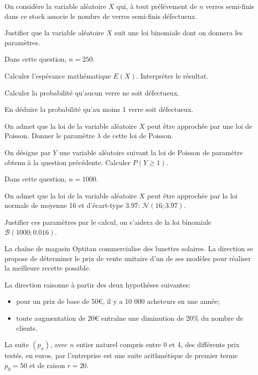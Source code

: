 \documentclass[a4paper,12pt]{scrartcl}
\begin{document}
On considère la variable aléatoire $X$ qui, à tout prélèvement de $n$ verres semi-finis dans ce stock associe le nombre de verres semi-finis défectueux.

\question{}
Justifier que la variable aléatoire $X$ suit une loi binomiale dont on donnera les paramètres. 

\question{}
Dans cette question, $n=250$.

\subquestion{}
Calculer l'espérance mathématique $E(X)$. Interpréter le résultat.

\subquestion{}
Calculer la probabilité qu'aucun verre ne soit défectueux.

\subquestion{}
En déduire la probabilité qu'au moins 1 verre soit défectueux.

\subquestion{}
On admet que la loi de la variable aléatoire $X$ peut être approchée par une loi de Poisson. Donner le paramètre $\lambda$ de cette loi de Poisson.

\subquestion{}
On désigne par $Y$ une variable aléatoire suivant la loi de Poisson de paramètre obtenu à la question précédente. Calculer $P(Y \geqslant 1)$. 

\question{}
Dans cette question, $n = 1000$.

On admet que la loi de la variable aléatoire $X$ peut être approchée par la loi normale de moyenne 16 et d'écart-type 3.97: $\mathcal{N}(16;3.97)$.

Justifier ces paramètres par le calcul, on s'aidera de la loi binomiale $\mathcal{B}(1000;0.016)$.


La chaîne de magasin Optitan commercialise des lunettes solaires. La direction se propose de déterminer le prix de vente unitaire d'un de ses modèles pour réaliser la meilleure recette possible.

La direction raisonne à partir des deux hypothèses suivantes:

\begin{itemize}
\item pour un prix de base de 50€, il y a 10 000 acheteurs en une année;
\item toute augmentation de 20€ entraîne une diminution de 20\% du nombre de clients.
\end{itemize}


\question{}
La suite $(p_n)$, avec $n$ entier naturel compris entre 0 et 4, des différents prix testés, en euros, par l'entreprise est une suite arithmétique de premier terme $p_0 = 50$ et de raison $r = 20$.
\end{document}

